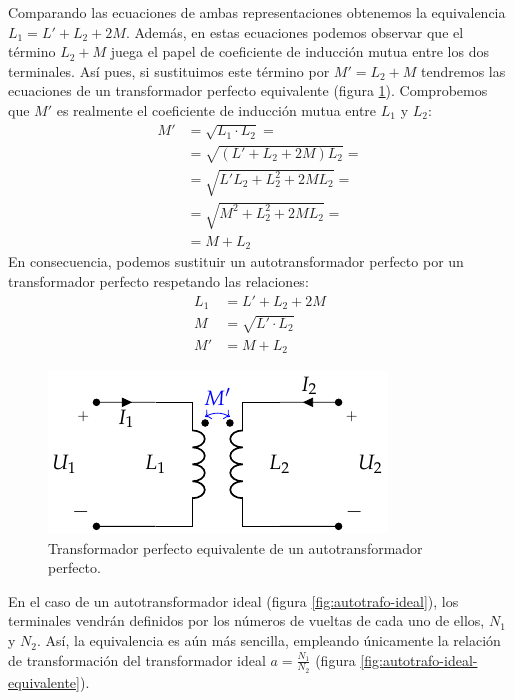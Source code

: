 Comparando las ecuaciones de ambas representaciones obtenemos la equivalencia $L_1 = L' + L_2 + 2M$. 
Además, en estas ecuaciones podemos observar que el término $L_2 + M$ juega el papel de coeficiente de inducción mutua entre los dos terminales. Así pues, si sustituimos este término por $M' = L_2 + M$ tendremos las ecuaciones de un transformador perfecto equivalente (figura \ref{fig:autotrafo-perfecto-equivalente}). Comprobemos que $M'$ es realmente el coeficiente de inducción mutua entre $L_1$ y $L_2$:
  \begin{align*}
  M' &= \sqrt{L_1 \cdot L_2} = \\
     &= \sqrt{(L' + L_2 + 2M) L_2} =\\
     &= \sqrt{L'L_2 + L_2^2 + 2ML_2} =\\
     &= \sqrt{M^2 + L_2^2 + 2ML_2} = \\
     &= M + L_2
\end{align*}
En consecuencia, podemos sustituir un autotransformador perfecto por un transformador perfecto respetando las relaciones:
\begin{align*}
  L_1 &= L' + L_2 + 2M\\
  M &= \sqrt{L' \cdot L_2}\\
  M' &= M + L_2
\end{align*}

\begin{figure}
  \centering
  \includegraphics[height=0.2\textheight]{../figs/AutoTrafo_TrafoPerfecto.pdf}
  \caption{Transformador perfecto equivalente de un autotransformador perfecto.}
  \label{fig:autotrafo-perfecto-equivalente}
\end{figure}

En el caso de un autotransformador ideal (figura \ref{fig:autotrafo-ideal}), los terminales vendrán definidos por los números de vueltas de cada uno de ellos, $N_1$ y $N_2$. Así, la equivalencia es aún más sencilla, empleando únicamente la relación de transformación del transformador ideal $a = \frac{N_1}{N_2}$ (figura \ref{fig:autotrafo-ideal-equivalente}).

